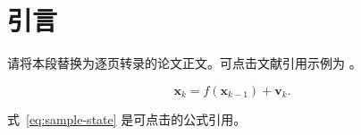 \section{引言}

请将本段替换为逐页转录的论文正文。可点击文献引用示例为 。

\begin{equation}
  \bm{x}_k = f(\bm{x}_{k-1}) + \bm{v}_k.
  \tag{1}\label{eq:sample-state}
\end{equation}

式~\eqref{eq:sample-state} 是可点击的公式引用。
